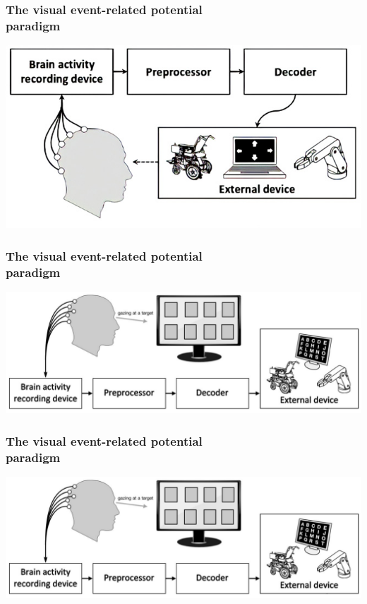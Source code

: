 \documentclass{kul-ulille-beamer}
\begin{document}
\begin{frame}
  \frametitle{The visual event-related potential \\ paradigm}
  \centering
  \includegraphics[width=.75\textwidth]{figures/intro/bci_loop.png}
\end{frame}

\begin{frame}
  \centering
  \frametitle{The visual event-related potential \\ paradigm}
  \includegraphics[width=.75\textwidth]{figures/intro/visual_bci_paradigm.png}
\end{frame}

\begin{frame}
  \centering
  \frametitle{The visual event-related potential \\ paradigm}
  \includegraphics[width=.75\textwidth]{figures/intro/visual_bci_paradigm.png}
\end{frame}
\end{document}
